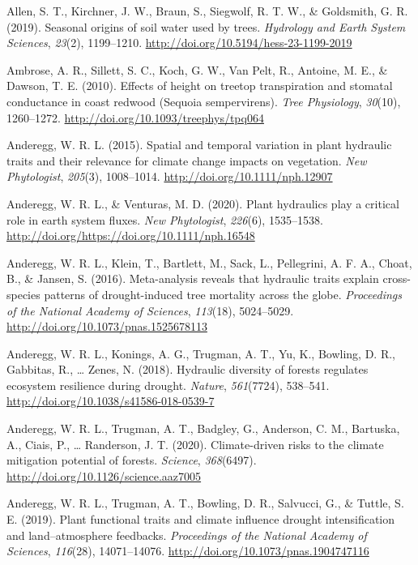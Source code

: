 \documentclass[11pt,twoside]{reedthesis}
\begin{document}
\hypertarget{ref-Allen2019}{}
Allen, S. T., Kirchner, J. W., Braun, S., Siegwolf, R. T. W., \&
Goldsmith, G. R. (2019). Seasonal origins of soil water used by trees.
\emph{Hydrology and Earth System Sciences}, \emph{23}(2), 1199--1210.
\url{http://doi.org/10.5194/hess-23-1199-2019}

\hypertarget{ref-Ambrose2010}{}
Ambrose, A. R., Sillett, S. C., Koch, G. W., Van Pelt, R., Antoine, M.
E., \& Dawson, T. E. (2010). Effects of height on treetop transpiration
and stomatal conductance in coast redwood (Sequoia sempervirens).
\emph{Tree Physiology}, \emph{30}(10), 1260--1272.
\url{http://doi.org/10.1093/treephys/tpq064}

\hypertarget{ref-anderegg_spatial_2015}{}
Anderegg, W. R. L. (2015). Spatial and temporal variation in plant
hydraulic traits and their relevance for climate change impacts on
vegetation. \emph{New Phytologist}, \emph{205}(3), 1008--1014.
\url{http://doi.org/10.1111/nph.12907}

\hypertarget{ref-AndereggVenturas2020}{}
Anderegg, W. R. L., \& Venturas, M. D. (2020). Plant hydraulics play a
critical role in earth system fluxes. \emph{New Phytologist},
\emph{226}(6), 1535--1538.
\url{http://doi.org/https://doi.org/10.1111/nph.16548}

\hypertarget{ref-anderegg_meta-analysis_2016}{}
Anderegg, W. R. L., Klein, T., Bartlett, M., Sack, L., Pellegrini, A. F.
A., Choat, B., \& Jansen, S. (2016). Meta-analysis reveals that
hydraulic traits explain cross-species patterns of drought-induced tree
mortality across the globe. \emph{Proceedings of the National Academy of
Sciences}, \emph{113}(18), 5024--5029.
\url{http://doi.org/10.1073/pnas.1525678113}

\hypertarget{ref-anderegg_hydraulic_2018}{}
Anderegg, W. R. L., Konings, A. G., Trugman, A. T., Yu, K., Bowling, D.
R., Gabbitas, R., \ldots{} Zenes, N. (2018). Hydraulic diversity of
forests regulates ecosystem resilience during drought. \emph{Nature},
\emph{561}(7724), 538--541.
\url{http://doi.org/10.1038/s41586-018-0539-7}

\hypertarget{ref-Anderegg2020}{}
Anderegg, W. R. L., Trugman, A. T., Badgley, G., Anderson, C. M.,
Bartuska, A., Ciais, P., \ldots{} Randerson, J. T. (2020).
Climate-driven risks to the climate mitigation potential of forests.
\emph{Science}, \emph{368}(6497).
\url{http://doi.org/10.1126/science.aaz7005}

\hypertarget{ref-anderegg_plant_2019}{}
Anderegg, W. R. L., Trugman, A. T., Bowling, D. R., Salvucci, G., \&
Tuttle, S. E. (2019). Plant functional traits and climate influence
drought intensification and land--atmosphere feedbacks.
\emph{Proceedings of the National Academy of Sciences}, \emph{116}(28),
14071--14076. \url{http://doi.org/10.1073/pnas.1904747116}
\end{document}
